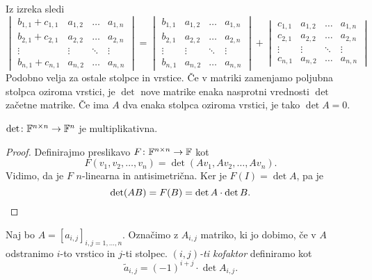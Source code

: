 \documentclass[12pt, a4paper]{article}
\begin{document}
\obvs

\begin{opomba}
Iz izreka sledi
\[
\begin{vmatrix}
b_{1,1}+c_{1,1} & a_{1,2} & \dots  & a_{1,n} \\ 
b_{2,1}+c_{2,1} & a_{2,2} & \dots  & a_{2,n} \\ 
\vdots          & \vdots  & \ddots & \vdots \\ 
b_{n,1}+c_{n,1} & a_{n,2} & \dots  & a_{n,n}
\end{vmatrix}
=
\begin{vmatrix}
b_{1,1} & a_{1,2} & \dots  & a_{1,n} \\ 
b_{2,1} & a_{2,2} & \dots  & a_{2,n} \\ 
\vdots  & \vdots  & \ddots & \vdots \\ 
b_{n,1} & a_{n,2} & \dots  & a_{n,n}
\end{vmatrix} 
+
\begin{vmatrix}
c_{1,1} & a_{1,2} & \dots  & a_{1,n} \\ 
c_{2,1} & a_{2,2} & \dots  & a_{2,n} \\ 
\vdots  & \vdots  & \ddots & \vdots \\ 
c_{n,1} & a_{n,2} & \dots  & a_{n,n}
\end{vmatrix} 
\]
Podobno velja za ostale stolpce in vrstice. Če v matriki zamenjamo poljubna stolpca oziroma vrstici, je $\det$ nove matrike enaka nasprotni vrednosti $\det$ začetne matrike. Če ima $A$ dva enaka stolpca oziroma vrstici, je tako $\det A=0$.
\end{opomba}

\begin{izrek}
$\det\colon\mathbb{F}^{n\times n}\to\mathbb{F}^n$ je multiplikativna.
\end{izrek}

\begin{proof}
Definirajmo preslikavo $F\colon\mathbb{F}^{n\times n}\to\mathbb{F}$ kot
\[
F(v_1,v_2,\dots,v_n)=\det(Av_1,Av_2,\dots,Av_n).
\]
Vidimo, da je $F$ $n$-linearna in antisimetrična. Ker je $F(I)=\det A$, pa je
\[
\det(AB)=F(B)=\det A\cdot\det B.\qedhere
\]
\end{proof}

\begin{definicija}
Naj bo $A=\left[a_{i,j}\right]_{i,j=1,\dots,n}$. Označimo z $A_{i,j}$ matriko, ki jo dobimo, če v $A$ odstranimo $i$-to vrstico in $j$-ti stolpec. \emph{$(i,j)$-ti kofaktor} definiramo kot
\[
\widetilde{a}_{i,j}=(-1)^{i+j}\cdot\det A_{i,j}.
\]
\end{definicija}
\end{document}
